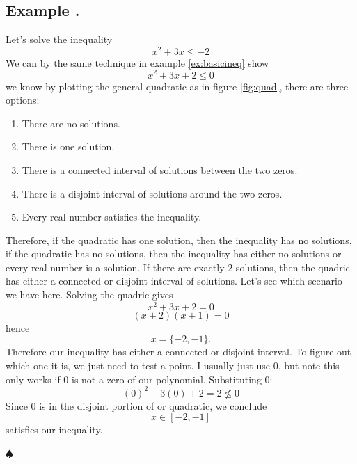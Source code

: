 \documentclass[11pt]{article}
\numberwithin{lemma}{section}
\numberwithin{equation}{section}
\numberwithin{define}{section}
\numberwithin{prop}{section}
\numberwithin{figure}{section}
\numberwithin{theorem}{section}
\numberwithin{cor}{section}
\newcounter{ex}[section]
\newenvironment{ex}[0]{

	\refstepcounter{ex}
    \subsection*{Example \theex .}
    }
    {
    \hfill$\spadesuit$
    \par
    }
\numberwithin{ex}{section}
\begin{document}
\begin{ex}
	Let's solve the inequality
	$$x^2+3x\le-2$$
	We can by the same technique in example \eqref{ex:basicineq} show
	$$x^2+3x+2\le0$$
	we know by plotting the general quadratic as in figure \eqref{fig:quad}, there are three options:
	\begin{figure}
		\centering
		\caption{}
		\label{fig:quad}
	\end{figure}
	\begin{enumerate}
		\item There are no solutions.
		\item There is one solution.
		\item There is a connected interval of solutions between the two zeros.
		\item There is a disjoint interval of solutions around the two zeros.
		\item Every real number satisfies the inequality.
	\end{enumerate}
	Therefore, if the quadratic has one solution, then the inequality has no solutions, if the quadratic has no solutions, then the inequality has either no solutions or every real number is a solution. If there are exactly 2 solutions, then the quadric has either a connected or disjoint interval of solutions. Let's see which scenario we have here. Solving the quadric gives
	$$x^2+3x+2=0$$
	$$(x+2)(x+1)=0$$
	hence
	$$x=\{-2,-1\}.$$
	Therefore our inequality has either a connected or disjoint interval. To figure out which one it is, we just need to test a point. I usually just use 0, but note this only works if 0 is not a zero of our polynomial. Substituting 0:
	$$(0)^2+3(0)+2=2\not\le 0$$
	Since $0$ is in the disjoint portion of or quadratic, we conclude
	$$x\in[-2,-1]$$
	satisfies our inequality.
\end{ex}
\end{document}
